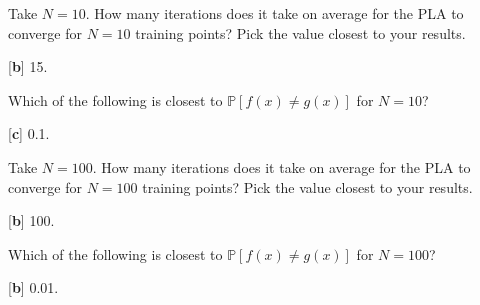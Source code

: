 \documentclass[answers]{exam}
\begin{document}
\begin{questions}
\setcounter{question}{6}
\question Take $N=10$. How many iterations does it take on average for the PLA 
to converge for $N=10$ training points? Pick the value closest to your results.

\begin{solution}
{[\textbf{b}]} 15.
\end{solution}

\question Which of the following is closest to $\mathbb{P}[f(x) \neq  g(x)]$
for $N = 10$?

\begin{solution}
{[\textbf{c}]} 0.1.
\end{solution}

\question Take $N=100$. How many iterations does it take on average for the PLA 
to converge for $N=100$ training points? Pick the value closest to your results.

\begin{solution}
{[\textbf{b}]} 100.
\end{solution}

\question Which of the following is closest to $\mathbb{P}[f(x) \neq  g(x)]$
for $N = 100$?

\begin{solution}
{[\textbf{b}]} 0.01.
\end{solution}
\end{questions}
\end{document}
